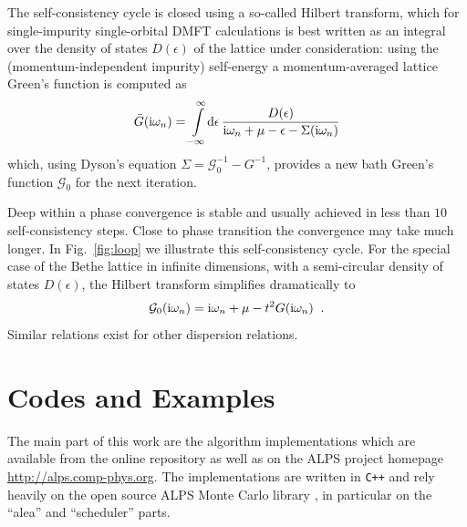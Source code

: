 \documentclass[3p,twocolumn]{elsarticle}
\begin{document}
The self-consistency cycle is closed using a so-called Hilbert transform, which for single-impurity single-orbital DMFT calculations is best written as an integral over the density
of states $D(\epsilon)$ of the lattice under consideration: using the (momentum-independent impurity) self-energy a momentum-averaged lattice Green's function is computed as
\begin{align}
  \bar G({\rm i}\omega_n) = \int\limits_{-\infty}^{\infty}\!{\rm d}\epsilon\, \frac{D(\epsilon)}
    {\mathrm{i}\omega_n + \mu - \epsilon - \Sigma({\rm i}\omega_n)}
\end{align}
which, using Dyson's equation $\Sigma = \mathcal{G}_0^{-1} - G^{-1}$, provides a new bath Green's function $\mathcal{G}_0$ for the next iteration.

Deep within a phase convergence is stable and usually achieved in less than $10$ self-consistency steps. Close to phase transition the convergence may take much longer.
In Fig.~\ref{fig:loop} we illustrate this self-consistency cycle. 
For the special case of the Bethe lattice \cite{Bethe35} in infinite dimensions, with
a semi-circular density of states $D(\epsilon)$, the Hilbert transform simplifies dramatically to
\begin{align}\label{HilbertSemi}
  \mathcal{G}_0({\rm i}\omega_n) = {\rm i}\omega_n + \mu - t^2 G({\rm
    i}\omega_n) \;\;.
\end{align}
Similar relations exist for other dispersion relations.

\section{Codes and Examples}\label{examples}
The main part of this work are the algorithm implementations which are available from the online repository as well as on the ALPS project homepage \href{http://alps.comp-phys.org}{http://alps.comp-phys.org}.
The implementations are written in \verb*#C++# and rely heavily on the open source ALPS Monte Carlo library \cite{ALPS}, in particular on the ``alea''\cite{oldALPS} and ``scheduler'' \cite{Troyer98} parts.
\end{document}
